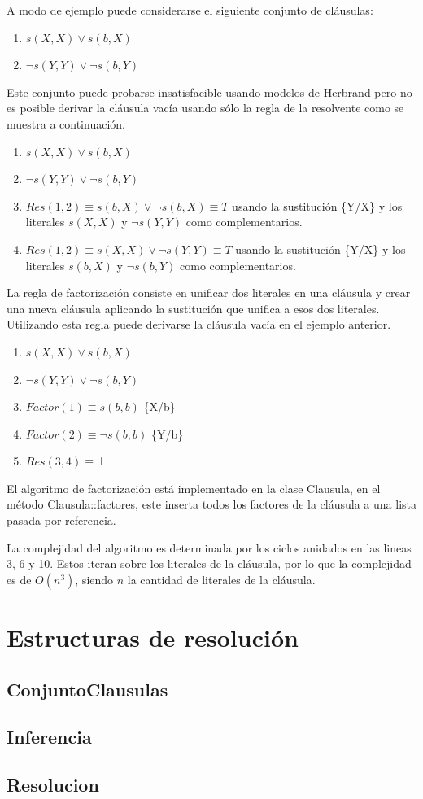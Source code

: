 \documentclass[a4paper,12pt]{article}
\begin{document}
A modo de ejemplo puede considerarse el siguiente conjunto de cláusulas:
\begin{enumerate}
\item $s(X,X)\lor s(b,X)$
\item $\lnot s(Y,Y)\lor \lnot s(b,Y)$
\end{enumerate}
Este conjunto puede probarse insatisfacible usando modelos de Herbrand pero no es posible
derivar la cláusula vacía usando sólo la regla de la resolvente como se muestra a continuación.
\begin{enumerate}
\item $s(X,X)\lor s(b,X)$
\item $\lnot s(Y,Y)\lor \lnot s(b,Y)$
\item $Res(1,2) \equiv s(b,X) \lor \lnot s(b,X) \equiv T$ usando la sustitución \{Y/X\} y los
literales $s(X,X)$ y $\lnot s(Y,Y)$ como complementarios.
\item $Res(1,2) \equiv s(X,X) \lor \lnot s(Y,Y) \equiv T$ usando la sustitución \{Y/X\} y los
literales $s(b,X)$ y $\lnot s(b,Y)$ como complementarios.
\end{enumerate}
La regla de factorización consiste en unificar dos literales en una cláusula y crear una nueva
cláusula aplicando la sustitución que unifica a esos dos literales. Utilizando esta regla puede
derivarse la cláusula vacía en el ejemplo anterior.
\begin{enumerate}
\item $s(X,X)\lor s(b,X)$
\item $\lnot s(Y,Y)\lor \lnot s(b,Y)$
\item $Factor(1) \equiv s(b,b)$ \{X/b\}
\item $Factor(2) \equiv \lnot s(b,b)$ \{Y/b\}
\item $Res(3,4) \equiv \bot$
\end{enumerate}
El algoritmo de factorización está implementado en la clase Clausula, en el método
Clausula::factores, este inserta todos los factores de la cláusula a una lista pasada
por referencia.

La complejidad del algoritmo es determinada por los ciclos anidados en las lineas 3, 6 y 10. Estos iteran
sobre los literales de la cláusula, por lo que la complejidad es de $O(n^3)$, siendo $n$ la cantidad de
literales de la cláusula.
\section{Estructuras de resolución}
\subsection{ConjuntoClausulas}
\subsection{Inferencia}
\subsection{Resolucion}


\end{document}
